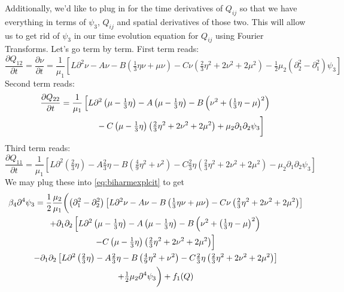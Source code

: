 \documentclass[reqno]{article}
\begin{document}
	Additionally, we'd like to plug in for the time derivatives of $Q_{ij}$ so that we have everything in terms of $\psi_3$, $Q_{ij}$ and spatial derivatives of those two. This will allow us to get rid of $\psi_3$ in our time evolution equation for $Q_{ij}$ using Fourier Transforms.  Let's go term by term. First term reads:
	\begin{equation}
		\frac{\partial Q_{12}}{\partial t} 
		= \frac{\partial \nu}{\partial t}
		= \frac{1}{\mu_1} \left[ 
		L\partial^2 \nu 
		- A\nu 
		- B\left(\tfrac{1}{3}\eta\nu + \mu\nu\right) 
		- C\nu\left( \tfrac{2}{3}\eta^2 + 2\nu^2 + 2\mu^2 \right)
		- \tfrac12 \mu_2 \left( \partial_2^2 - \partial_1^2 \right) \psi_3
		 \right]
	\end{equation}
	Second term reads:
	\begin{equation}
	\begin{split}
		\frac{\partial Q_{22}}{\partial t} 
		&= \frac{1}{\mu_1}\left[ 
		L\partial^2 \left( \mu - \tfrac{1}{3}\eta \right) 
		- A\left( \mu - \tfrac{1}{3}\eta \right) 
		- B\left( \nu^2 + \left( \tfrac13 \eta - \mu \right)^2 \right)
		\right. \\
		&\qquad\qquad\left.\vphantom{\frac13^2} 
		- C\left( \mu - \tfrac{1}{3}\eta \right)
		\left( \tfrac{2}{3}\eta^2 + 2\nu^2 + 2\mu^2 \right) 
		+ \mu_2 \partial_1\partial_2 \psi_3 
		\right]
	\end{split}
	\end{equation}
	Third term reads:
	\begin{equation}
		\frac{\partial Q_{11}}{\partial t} = \frac{1}{\mu_1} \left[L\partial^2 \left( \tfrac{2}{3}\eta \right) - A \tfrac{2}{3}\eta - B\left( \tfrac{4}{9}\eta^2 + \nu^2 \right) - C \tfrac{2}{3}\eta \left( \tfrac{2}{3}\eta^2 + 2\nu^2 + 2\mu^2 \right) - \mu_2 \partial_1\partial_2 \psi_3 \right]
	\end{equation}
	We may plug these into \eqref{eq:biharmexplcit} to get
	\begin{multline}
		\beta_4 \partial^4 \psi_3 = \frac12 \frac{\mu_2}{\mu_1} \biggl( \left( \partial_1^2 - \partial_2^2\right)\left[ L\partial^2 \nu - A\nu - B\left(\tfrac{1}{3}\eta\nu + \mu\nu\right) - C\nu\left( \tfrac{2}{3}\eta^2 + 2\nu^2 + 2\mu^2 \right) \right]\biggr. \\
		+ \partial_1\partial_2 \left[ L\partial^2 \left( \mu - \tfrac{1}{3}\eta \right) - A\left( \mu - \tfrac{1}{3}\eta \right) - B\left( \nu^2 + 
		\left( \tfrac{1}{3}\eta - \mu \right)^2 \right)\right. \\
		\Bigl.- C\left( \mu - \tfrac{1}{3}\eta \right)\left( \tfrac{2}{3}\eta^2 + 2\nu^2 + 2\mu^2 \right) \Bigr] \\
		- \partial_1\partial_2 \left[L\partial^2 \left( \tfrac{2}{3}\eta \right) - A \tfrac{2}{3}\eta - B\left( \tfrac{4}{9}\eta^2 + \nu^2 \right) - C \tfrac{2}{3}\eta \left( \tfrac{2}{3}\eta^2 + 2\nu^2 + 2\mu^2 \right) \right] \\
		\biggl. + \tfrac12 \mu_2 \partial^4 \psi_3 \biggr) + f_1(Q) \\
	\end{multline}
\end{document}
